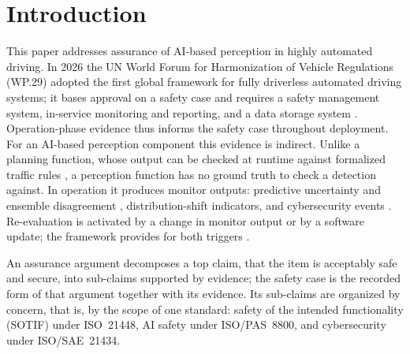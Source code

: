 \documentclass[conference,a4paper]{IEEEtran}
\begin{document}
	\section{Introduction}
	This paper addresses assurance of AI-based perception in highly automated driving. In 2026 the UN World Forum for Harmonization of Vehicle Regulations (WP.29) adopted the first global framework for fully driverless automated driving systems; it bases approval on a safety case and requires a safety management system, in-service monitoring and reporting, and a data storage system \cite{UNECE2026}. Operation-phase evidence thus informs the safety case throughout deployment. For an AI-based perception component this evidence is indirect. Unlike a planning function, whose output can be checked at runtime against formalized traffic rules \cite{Maierhofer2020}, a perception function has no ground truth to check a detection against. In operation it produces monitor outputs: predictive uncertainty and ensemble disagreement \cite{PatelJungVEHITS2026}, distribution-shift indicators, and cybersecurity events \cite{ISO21434}. Re-evaluation is activated by a change in monitor output or by a software update; the framework provides for both triggers \cite{UNECE2026}.
	
	An assurance argument decomposes a top claim, that the item is acceptably safe and secure, into sub-claims supported by evidence; the safety case is the recorded form of that argument together with its evidence. Its sub-claims are organized by concern, that is, by the scope of one standard: safety of the intended functionality (SOTIF) under ISO~21448, AI safety under ISO/PAS~8800, and cybersecurity under ISO/SAE~21434.
\end{document}
